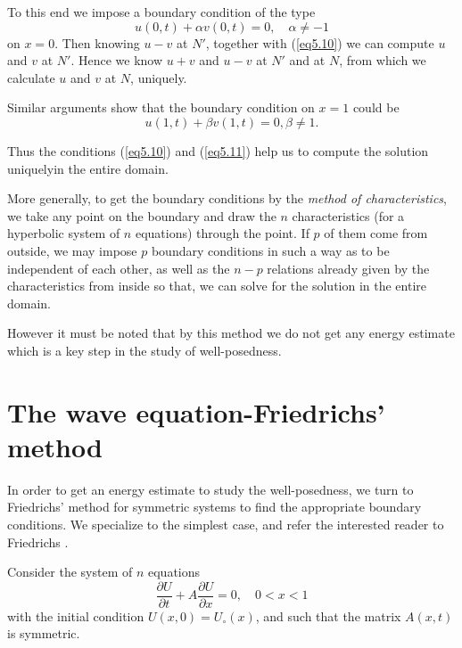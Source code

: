 To this end we impose a boundary condition of the type
\begin{equation*}
u(0,t) + \alpha v(0,t) = 0, \quad \alpha \neq -1 \tag{5.10}\label{eq5.10}
\end{equation*}
on $x=0$. Then knowing $u-v$ at $N'$, together with (\ref{eq5.10}) we can
compute $u$ and $v$ at $N'$. Hence we know $u+v$ and $u-v$ at $N'$ and
at $N$, from which we calculate $u$ and $v$ at $N$, uniquely.

Similar arguments show that the boundary condition on $x=1$ could be 
\begin{equation*}
u(1,t) + \beta v(1,t ) = 0, \beta \neq 1. \tag{5.11}\label{eq5.11}
\end{equation*}

Thus the conditions (\ref{eq5.10}) and (\ref{eq5.11}) help us to
compute the solution  uniquely\pageoriginale in the entire domain.  

More generally, to get the boundary conditions by the {\em method of
  characteristics}, we take any point on the boundary and draw the $n$
characteristics (for a hyperbolic system of $n$ equations) through the
point. If $p$ of them come from outside, we may impose $p$ boundary
conditions in such a way as to be independent of each other, as well
as the $n-p$ relations already given by the characteristics from
inside so that, we can solve for the solution in the entire domain.

However it must be noted that by this method we do not get any energy
estimate which is a key step in the study of well-posedness.

\section{The wave equation-Friedrichs' method}\label{chap5:sec5.5}

In order to get an energy estimate to study the well-posedness, we
turn to Friedrichs' method for symmetric systems to find the
appropriate boundary conditions. We specialize to the simplest case,
and refer the interested reader to Friedrichs \cite{key10}.

Consider the system of $n$ equations
\begin{equation*}
\frac{\partial U}{\partial t} + A \frac{\partial U}{\partial x} = 0,
\quad 0< x < 1\tag{5.12}\label{eq5.12}
\end{equation*}
with the initial condition  $U(x,0) = U_\circ(x)$, and such that
the matrix $A(x,t)$ is symmetric.

